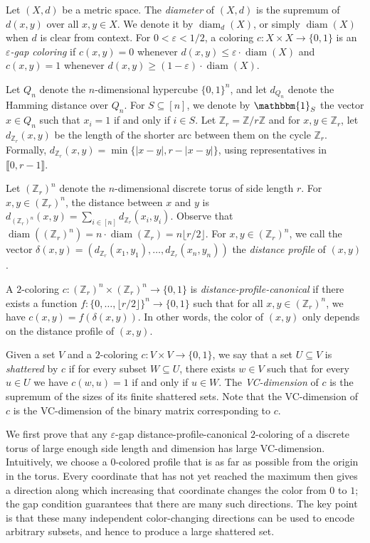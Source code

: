 \documentclass[10pt,a4paper]{amsart}
\DeclareMathOperator{\diam}{diam}
\begin{document}
Let $(X, d)$ be a metric space. 
The \emph{diameter} of $(X, d)$ is the supremum of $d(x, y)$ over all $x, y \in X$. We denote it by $\diam_d(X)$, or simply $\diam(X)$ when $d$ is clear from context.
For $0 < \varepsilon < 1/2$, a coloring $c : X \times X \to \{0, 1\}$ is an \emph{$\varepsilon$-gap coloring} if $c(x, y) = 0$ whenever $d(x, y) \leq \varepsilon \cdot \diam(X)$ and $c(x, y) = 1$ whenever $d(x, y) \geq (1-\varepsilon) \cdot \diam(X)$.

Let $Q_n$ denote the $n$-dimensional hypercube $\{0, 1\}^n$, and let $d_{Q_n}$ denote the Hamming distance over $Q_n$.
For $S \subseteq [n]$, we denote by $\mathbbm{1}_S$ the vector $x \in Q_n$ such that $x_i = 1$ if and only if $i \in S$. 
Let $\mathbb{Z}_r = \mathbb{Z}/r\mathbb{Z}$ and for $x, y \in \mathbb{Z}_r$, let $d_{\mathbb{Z}_r}(x, y)$ be the length of the shorter arc between them on the cycle $\mathbb Z_r$. 
Formally, $d_{\mathbb{Z}_r}(x, y) = \min\{|x-y|, r - |x-y|\}$, using representatives in $\llbracket0, r-1\rrbracket$.

Let $(\mathbb Z_r)^n$ denote the $n$-dimensional discrete torus of side length $r$.
For $x, y \in (\mathbb{Z}_r)^n$, the distance between $x$ and $y$ is $d_{(\mathbb{Z}_r)^n}(x, y) = \sum_{i \in [n]}d_{\mathbb{Z}_r}(x_i, y_i)$.
Observe that $\diam((\mathbb{Z}_r)^n) = n \cdot \diam(\mathbb{Z}_r) = n \lfloor r/2 \rfloor$.
For $x, y \in (\mathbb{Z}_r)^n$, we call the vector $\delta(x, y) = (d_{\mathbb{Z}_r}(x_1, y_1), \ldots, d_{\mathbb{Z}_r}(x_n, y_n))$ the \emph{distance profile} of $(x, y)$.

A $2$-coloring $c : (\mathbb{Z}_{r})^n \times (\mathbb{Z}_{r})^n \to \{0, 1\}$ is \emph{distance-profile-canonical} if there exists a function $f : \{0, \ldots, \lfloor r/2 \rfloor\}^n \to \{0, 1\}$ such that for all $x,y \in (\mathbb{Z}_{r})^n$, we have $c(x, y) = f(\delta(x, y))$. In other words, the color of $(x, y)$ only depends on the distance profile of $(x, y)$.

Given a set $V$ and a $2$-coloring $c : V \times V \to \{0, 1\}$, we say that a set $U \subseteq V$ is \emph{shattered} by $c$ if for every subset $W \subseteq U$, there exists $w \in V$ such that for every $u \in U$ we have $c(w, u) = 1$ if and only if $u \in W$.
The \emph{VC-dimension} of $c$ is the supremum of the sizes of its finite shattered sets.
Note that the VC-dimension of $c$ is the VC-dimension of the binary matrix corresponding to $c$.

We first prove that any $\varepsilon$-gap distance-profile-canonical $2$-coloring of a discrete torus of large enough side length and dimension has large VC-dimension.
Intuitively, we choose a $0$-colored profile that is as far as possible from the origin in the torus. Every coordinate that has not yet reached the maximum then gives a direction along which increasing that coordinate changes the color from $0$ to $1$; the gap condition guarantees that there are many such directions. 
The key point is that these many independent color-changing directions can be used to encode arbitrary subsets, and hence to produce a large shattered set.
\end{document}
